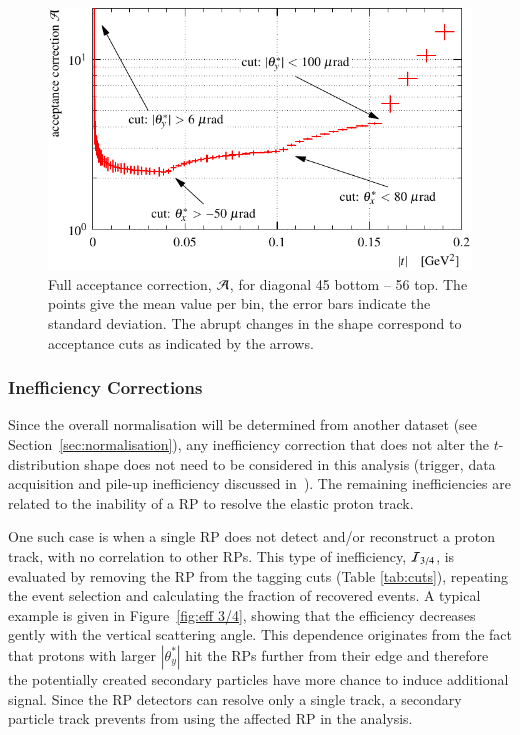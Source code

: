 \begin{figure}
\begin{center}
\includegraphics{fig/acc_corr_hist_lab.pdf}
\caption{%
Full acceptance correction, ${\cal A}$, for diagonal 45 bottom -- 56 top. The points give the mean value per bin, the error bars indicate the standard deviation. The abrupt changes in the shape correspond to acceptance cuts as indicated by the arrows.
}
\label{fig:acc corr res}
\end{center}
\end{figure}




\subsubsection{Inefficiency Corrections}
\label{sec:ineff corr}

Since the overall normalisation will be determined from another dataset (see Section~\ref{sec:normalisation}), any inefficiency correction that does not alter the $t$-distribution shape does not need to be considered in this analysis (trigger, data acquisition and pile-up inefficiency discussed in~\cite{epl101-el,prl111}). The remaining inefficiencies are related to the inability of a RP to resolve the elastic proton track.

One such case is when a single RP does not detect and/or reconstruct a proton track, with no correlation to other RPs. This type of inefficiency, ${\cal I}_{3/4}$, is evaluated by removing the RP from the tagging cuts (Table \ref{tab:cuts}), repeating the event selection and calculating the fraction of recovered events. A typical example is given in Figure~\ref{fig:eff 3/4}, showing that the efficiency decreases gently with the vertical scattering angle. This dependence originates from the fact that protons with larger $|\theta_y^*|$ hit the RPs further from their edge and therefore the potentially created secondary particles have more chance to induce additional signal. Since the RP detectors can resolve only a single track, a secondary particle track prevents from using the affected RP in the analysis.

